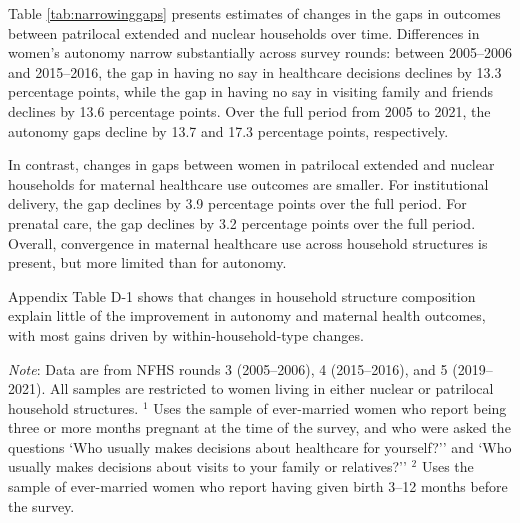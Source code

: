 \documentclass[10pt,twoside,reqno]{article}
\begin{document}
Table \ref{tab:narrowinggaps} presents estimates of changes in the gaps in outcomes between patrilocal extended and nuclear households over time.  Differences in women’s autonomy narrow substantially across survey rounds: between 2005–2006 and 2015–2016, the gap in having no say in healthcare decisions declines by 13.3 percentage points, while the gap in having no say in visiting family and friends declines by 13.6 percentage points. Over the full period from 2005 to 2021, the autonomy gaps decline by 13.7 and 17.3 percentage points, respectively.

In contrast, changes in gaps between women in patrilocal extended and nuclear households for maternal healthcare use outcomes are smaller. For institutional delivery, the gap declines by 3.9 percentage points over the full period. For prenatal care, the gap declines by 3.2 percentage points over the full period. Overall, convergence in maternal healthcare use across household structures is present, but more limited than for autonomy. 

Appendix Table D-1 shows that changes in household structure composition explain little of the improvement in autonomy and maternal health outcomes, with most gains driven by within-household-type changes. 

\begin{table}[H]
\sffamily
\caption{: The gap between patrilocal extended and nuclear households in women's autonomy and healthcare use is narrowing over time}
\label{tab:narrowinggaps}
\vspace{-4pt}

\begin{scriptsize}
\setlength{\tabcolsep}{6pt}
\renewcommand{\arraystretch}{1.6}

\makebox[\linewidth][c]{%
%
}

\end{scriptsize}

\vspace{1ex}
\small\scriptsize{\textsf{\textit{Note}: Data are from NFHS rounds 3 (2005--2006), 4 (2015--2016), and 5 (2019--2021).}}
\newline
\small\scriptsize{\textsf{All samples are restricted to women living in either nuclear or patrilocal household structures.}}
\newline
\small\scriptsize{\textsf{$^1$ Uses the sample of ever-married women who report being three or more months pregnant at the time of the survey, and who were asked the questions `Who usually makes decisions about healthcare for yourself?'' and `Who usually makes decisions about visits to your family or relatives?''}}
\newline
\small\scriptsize{\textsf{$^2$ Uses the sample of ever-married women who report having given birth 3--12 months before the survey.}}
\end{table}
\end{document}
